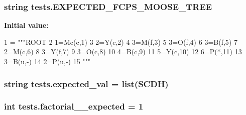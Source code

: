 \subsubsection[{E\+X\+P\+E\+C\+T\+E\+D\+\_\+\+F\+C\+P\+S\+\_\+\+M\+O\+O\+S\+E\+\_\+\+T\+R\+E\+E}]{\setlength{\rightskip}{0pt plus 5cm}string tests.\+E\+X\+P\+E\+C\+T\+E\+D\+\_\+\+F\+C\+P\+S\+\_\+\+M\+O\+O\+S\+E\+\_\+\+T\+R\+E\+E}\label{namespacetests_aeb3dec3064640f57137f1a71ca72708d}
{\bfseries Initial value\+:}
\begin{DoxyCode}
1 = \textcolor{stringliteral}{"""ROOT}
2 \textcolor{stringliteral}{    1=Mc(c,1)}
3 \textcolor{stringliteral}{        2=Y(c,2)}
4 \textcolor{stringliteral}{            3=M(f,3)}
5 \textcolor{stringliteral}{            3=O(f,4)}
6 \textcolor{stringliteral}{            3=B(f,5)}
7 \textcolor{stringliteral}{        2=M(c,6)}
8 \textcolor{stringliteral}{            3=Y(f,7)}
9 \textcolor{stringliteral}{            3=O(c,8)}
10 \textcolor{stringliteral}{                4=B(c,9)}
11 \textcolor{stringliteral}{                    5=Y(c,10)}
12 \textcolor{stringliteral}{                        6=P(*,11)}
13 \textcolor{stringliteral}{            3=B(u,-)}
14 \textcolor{stringliteral}{        2=P(u,-)}
15 \textcolor{stringliteral}{"""}
\end{DoxyCode}
\hypertarget{namespacetests_a199e05e5888c9dc641a251933f4366ef}{}
\subsubsection[{expected\+\_\+val}]{\setlength{\rightskip}{0pt plus 5cm}string tests.\+expected\+\_\+val = list(\textquotesingle{}S\+C\+D\+H\textquotesingle{})}\label{namespacetests_a199e05e5888c9dc641a251933f4366ef}
\hypertarget{namespacetests_a559d14a381b4ccb68d5015f9255a35d5}{}
\subsubsection[{factorial\+\_\+1\+\_\+expected}]{\setlength{\rightskip}{0pt plus 5cm}int tests.\+factorial\+\_\+\_\+expected = 1}\label{namespacetests_a559d14a381b4ccb68d5015f9255a35d5}
\hypertarget{namespacetests_ad75ade2f76275339e399cef79961ef0a}{}
